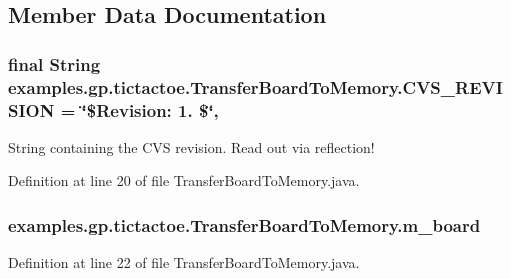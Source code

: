 \subsection{Member Data Documentation}
\hypertarget{classexamples_1_1gp_1_1tictactoe_1_1_transfer_board_to_memory_a18aba40acbbd97d691f56f51777746dd}{
\subsubsection[{C\-V\-S\-\_\-\-R\-E\-V\-I\-S\-I\-O\-N}]{\setlength{\rightskip}{0pt plus 5cm}final String examples.\-gp.\-tictactoe.\-Transfer\-Board\-To\-Memory.\-C\-V\-S\-\_\-\-R\-E\-V\-I\-S\-I\-O\-N = \char`\"{}\$Revision\-: 1. \$\char`\"{}\hspace{0.3cm}{\ttfamily [static]}, {\ttfamily [private]}}}\label{classexamples_1_1gp_1_1tictactoe_1_1_transfer_board_to_memory_a18aba40acbbd97d691f56f51777746dd}
String containing the C\-V\-S revision. Read out via reflection! 

Definition at line 20 of file Transfer\-Board\-To\-Memory.\-java.

\hypertarget{classexamples_1_1gp_1_1tictactoe_1_1_transfer_board_to_memory_a7b6005b6b5149d19419491044af8ba79}{
\subsubsection[{m\-\_\-board}]{ examples.\-gp.\-tictactoe.\-Transfer\-Board\-To\-Memory.\-m\-\_\-board\hspace{0.3cm}{\ttfamily [private]}}}\label{classexamples_1_1gp_1_1tictactoe_1_1_transfer_board_to_memory_a7b6005b6b5149d19419491044af8ba79}


Definition at line 22 of file Transfer\-Board\-To\-Memory.\-java.



